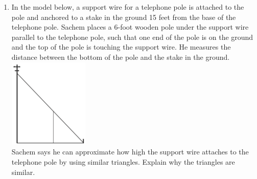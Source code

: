 \documentclass[12pt, twoside]{article}
\begin{document}
\begin{enumerate}
  \item In the model below, a support wire for a telephone pole is attached to the pole and anchored to a stake in the ground 15 feet from the base of the telephone pole. Sachem places a 6-foot wooden pole under the support wire parallel to the telephone pole, such that one end of the pole is on the ground and the top of the pole is touching the support wire. He measures the distance between the bottom of the pole and the stake in the ground.\\[0.5cm]
    \includegraphics[width=0.3\textwidth]{pole_Aug2018-29.png}\\
  Sachem says he can approximate how high the support wire attaches to the telephone pole by using similar triangles. Explain why the triangles are similar.


  \end{enumerate}
  \newpage
  \setcounter{page}{1}
\end{document}
